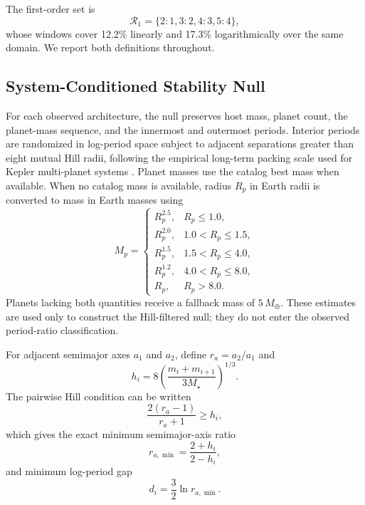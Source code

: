 \documentclass[twocolumn,linenumbers]{aastex631}
\begin{document}
The first-order set is
\begin{equation}
\mathcal{R}_1=\{2\!:\!1,3\!:\!2,4\!:\!3,5\!:\!4\},
\end{equation}
whose windows cover 12.2\% linearly and 17.3\% logarithmically over the same
domain. We report both definitions throughout.

\subsection{System-Conditioned Stability Null}

For each observed architecture, the null preserves host mass, planet count,
the planet-mass sequence, and the innermost and outermost periods. Interior
periods are randomized in log-period space subject to adjacent separations
greater than eight mutual Hill radii, following the empirical long-term
packing scale used for Kepler multi-planet systems \citep{puwu2015}. Planet
masses use the catalog best mass
when available. When no catalog mass is available, radius $R_p$ in Earth
radii is converted to mass in Earth masses using
\begin{equation}
M_p=\begin{cases}
R_p^{2.5}, & R_p\leq1.0,\\
R_p^{2.0}, & 1.0<R_p\leq1.5,\\
R_p^{1.5}, & 1.5<R_p\leq4.0,\\
R_p^{1.2}, & 4.0<R_p\leq8.0,\\
R_p, & R_p>8.0.
\end{cases}
\end{equation}
Planets lacking both quantities receive a fallback mass of $5\,M_\oplus$.
These estimates are used only to construct the Hill-filtered null; they do not
enter the observed period-ratio classification.

For adjacent semimajor axes $a_1$ and $a_2$, define $r_a=a_2/a_1$ and
\begin{equation}
h_i=8\left(\frac{m_i+m_{i+1}}{3M_\star}\right)^{1/3}.
\end{equation}
The pairwise Hill condition can be written
\begin{equation}
\frac{2(r_a-1)}{r_a+1}\geq h_i,
\end{equation}
which gives the exact minimum semimajor-axis ratio
\begin{equation}
r_{a,\min}=\frac{2+h_i}{2-h_i},
\end{equation}
and minimum log-period gap
\begin{equation}
d_i=\frac{3}{2}\ln r_{a,\min}.
\end{equation}
\end{document}
